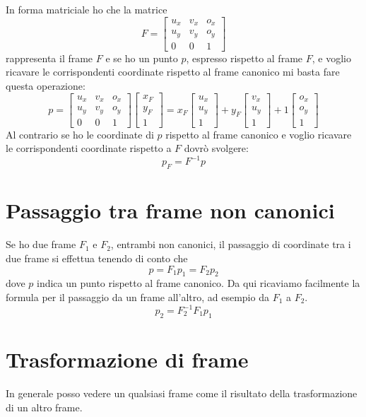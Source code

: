 In forma matriciale ho che la matrice
\[
	F = \begin{bmatrix}
		u_x & v_x & o_x \\
		u_y & v_y & o_y \\
		0   & 0   & 1
	\end{bmatrix}
\]
rappresenta il frame $F$ e se ho un punto $p$, espresso rispetto al frame $F$, e voglio ricavare le corrispondenti
coordinate rispetto al frame canonico mi basta fare questa operazione:
\[
	p = \begin{bmatrix}
		u_x & v_x & o_x \\
		u_y & v_y & o_y \\
		0   & 0   & 1
	\end{bmatrix}
	\begin{bmatrix}
		x_F \\ y_F \\ 1
	\end{bmatrix} =
	x_F \begin{bmatrix}
		u_x \\ u_y \\ 1
	\end{bmatrix} +
	y_F \begin{bmatrix}
		v_x \\ u_y \\ 1
	\end{bmatrix} +
	1 \begin{bmatrix}
		o_x \\ o_y \\ 1
	\end{bmatrix}
\]
Al contrario se ho le coordinate di $p$ rispetto al frame canonico e voglio ricavare le corrispondenti coordinate rispetto
a $F$ dovr\`o svolgere:
\[ p_F = F^{-1} p \]

\section{Passaggio tra frame non canonici}
Se ho due frame $F_1$ e $F_2$, entrambi non canonici, il passaggio di coordinate tra i due frame si effettua tenendo di
conto che
\[ p = F_1 p_1 = F_2 p_2 \]
dove $p$ indica un punto rispetto al frame canonico. Da qui ricaviamo facilmente la formula per il passaggio da un frame
all'altro, ad esempio da $F_1$ a $F_2$.
\[ p_2 = F_2^{-1} F_1 p_1 \]

\section{Trasformazione di frame}
In generale posso vedere un qualsiasi frame come il risultato della trasformazione di un altro frame.

